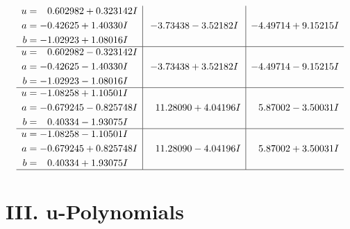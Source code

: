 \documentclass[1p]{elsarticle_modified}
\theoremstyle{definition}
\begin{document}
$$\begin{array}{c|c|c}
\begin{aligned}
u &= \phantom{-}0.602982 + 0.323142 I \\
a &= -0.42625 + 1.40330 I \\
b &= -1.02923 + 1.08016 I\end{aligned}
 & -3.73438 - 3.52182 I & -4.49714 + 9.15215 I \\ \hline\begin{aligned}
u &= \phantom{-}0.602982 - 0.323142 I \\
a &= -0.42625 - 1.40330 I \\
b &= -1.02923 - 1.08016 I\end{aligned}
 & -3.73438 + 3.52182 I & -4.49714 - 9.15215 I \\ \hline\begin{aligned}
u &= -1.08258 + 1.10501 I \\
a &= -0.679245 - 0.825748 I \\
b &= \phantom{-}0.40334 - 1.93075 I\end{aligned}
 & \phantom{-}11.28090 + 4.04196 I & \phantom{-}5.87002 - 3.50031 I \\ \hline\begin{aligned}
u &= -1.08258 - 1.10501 I \\
a &= -0.679245 + 0.825748 I \\
b &= \phantom{-}0.40334 + 1.93075 I\end{aligned}
 & \phantom{-}11.28090 - 4.04196 I & \phantom{-}5.87002 + 3.50031 I\\
 \hline 
 \end{array}$$\newpage
\newpage\renewcommand{\arraystretch}{1}
\centering \section*{ III. u-Polynomials}
\end{document}
